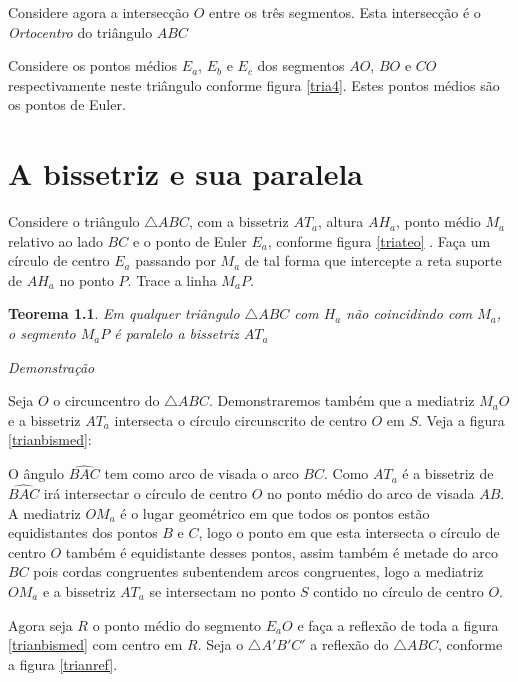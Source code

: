 \documentclass[12pt, openright, a4paper, brazil, openany, oneside]{abntex2}
\newtheorem{teo}{Teorema}
\begin{document}
\newpage

Considere agora a intersecção $O$ entre os três segmentos. Esta intersecção é o \textit{Ortocentro} do triângulo $ABC$

Considere os pontos médios $E_a$, $E_b$ e $E_c$ dos segmentos $AO$, $BO$ e $CO$ respectivamente neste triângulo conforme figura \ref{tria4}. Estes pontos médios são os pontos de Euler.


\chapter{A bissetriz e sua paralela}

Considere o triângulo $\triangle ABC$, com a bissetriz $AT_a$, altura $AH_a$, ponto médio $M_a$ relativo ao lado $BC$ e o ponto de Euler $E_a$, conforme figura \ref{triateo} . Faça um círculo de centro $E_a$ passando por $M_a$ de tal forma que intercepte a reta suporte de $AH_a$ no ponto $P$. Trace a linha $M_{a}P$.

\begin{teo}\label{teo1}
	Em qualquer triângulo $\triangle ABC$ com $H_a$ não coincidindo com $M_a$, o segmento $M_{a}P$ é paralelo a bissetriz $AT_a$
\end{teo}



\textit{Demonstração}

Seja $O$ o circuncentro do $\triangle ABC$. Demonstraremos também que a mediatriz $M_{a}O$ e a bissetriz $AT_a$ intersecta o círculo circunscrito de centro $O$ em $S$. Veja a figura \ref{trianbismed}:


O ângulo $\hat{BAC}$ tem como arco de visada o arco $BC$. Como $AT_a$ é a bissetriz de $\hat{BAC}$ irá intersectar o círculo de centro $O$ no ponto médio do arco de visada $AB$. A mediatriz $OM_a$ é o lugar geométrico em que todos os pontos estão equidistantes dos pontos $B$ e $C$, logo o ponto em que esta intersecta o círculo de centro $O$ também é equidistante desses pontos, assim também é metade do arco $BC$ pois cordas congruentes subentendem arcos congruentes, logo a mediatriz $OM_a$ e a bissetriz $AT_a$ se intersectam no ponto $S$ contido no círculo de centro $O$.

Agora seja $R$ o ponto médio do segmento $E_{a}O$ e faça a reflexão de toda a figura \ref{trianbismed} com centro em $R$. Seja o  $\triangle A'B'C'$ a reflexão do $\triangle ABC$, conforme a figura \ref{trianref}.
\end{document}
